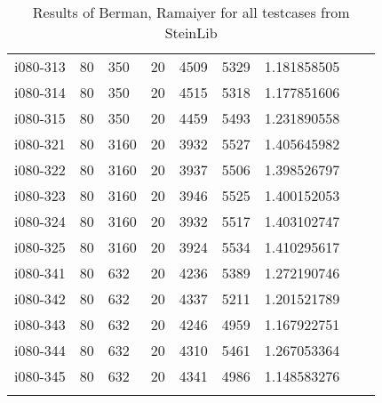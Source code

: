 \begin{appendices}
\begin{longtable}[htbp]{l l l l l l l l l}
 i080-313	&	80 	&	350 	&	20 	&	4509	&	5329	&	1.181858505	&		\\
 i080-314	&	80 	&	350 	&	20 	&	4515	&	5318	&	1.177851606	&		\\
 i080-315	&	80 	&	350 	&	20 	&	4459	&	5493	&	1.231890558	&		\\
\hline
 i080-321	&	80 	&	3160 	&	20 	&	3932	&	5527	&	1.405645982	&		\\
 i080-322	&	80 	&	3160 	&	20 	&	3937	&	5506	&	1.398526797	&		\\
 i080-323	&	80 	&	3160 	&	20 	&	3946	&	5525	&	1.400152053	&		\\
 i080-324	&	80 	&	3160 	&	20 	&	3932	&	5517	&	1.403102747	&		\\
 i080-325	&	80 	&	3160 	&	20 	&	3924	&	5534	&	1.410295617	&		\\
\hline
 i080-341	&	80 	&	632 	&	20 	&	4236	&	5389	&	1.272190746	&		\\
 i080-342	&	80 	&	632 	&	20 	&	4337	&	5211	&	1.201521789	&		\\
 i080-343	&	80 	&	632 	&	20 	&	4246	&	4959	&	1.167922751	&		\\
 i080-344	&	80 	&	632 	&	20 	&	4310	&	5461	&	1.267053364	&		\\
 i080-345	&	80 	&	632 	&	20 	&	4341	&	4986	&	1.148583276	&		\\
\caption{Results of Berman, Ramaiyer for all testcases from SteinLib \cite{Dui93}}\label{tab:BeRaFullResults} 	
\end{longtable}

\newpage


\end{appendices}
